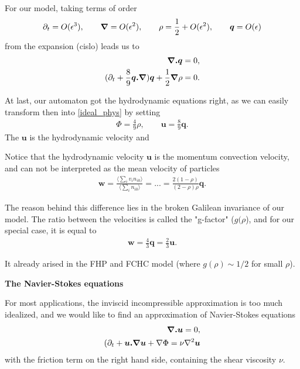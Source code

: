 For our model, taking terms of order
\begin{align}
\partial_t = O(\epsilon^3), \qquad \bm{\nabla} = O(\epsilon^2), \qquad \rho = \frac{1}{2} + O(\epsilon^2), \qquad \bm{q} = O(\epsilon)
\end{align}
from the expansion (cislo) leads us to
\begin{align}
\begin{split}
\bm{\nabla . q} &= 0, \\ 
(\partial_t + \frac{8}{9}\bm{q.\nabla})\bm{q} + \frac{1}{2} \bm{\nabla} \rho &= 0.
\end{split}
\end{align}

At last, our automaton got the hydrodynamic equations right, as we can easily transform then into \ref{ideal_phys} by setting
\begin{align} \label{transfor}
 \Phi = \frac{4}{9} \rho, \qquad \bm{u} = \frac{8}{9} \bm{q}.
\end{align}  
The $\bm{u}$ is the hydrodynamic velocity and 

Notice that the hydrodynamic velocity $\bm{u}$ is the momentum convection velocity, and can not be interpreted as the mean velocity of particles
\begin{align}
\bm{w} = \frac{\langle \sum_i v_i n_{i0} \rangle}{\langle \sum_i n_{i0} \rangle} = ... = \frac{2(1-\rho)}{(2 - \rho) \rho}\bm{q}.
\end{align}

The reason behind this difference lies in the broken Galilean invariance of our model.
The ratio between the velocities is called the "g-factor" ($g(\rho$), and for our special case, it is equal to
\begin{align}
\bm{w} = \frac{4}{3} \bm{q} = \frac{2}{3} \bm{u}.
\end{align}

It already arised in the FHP and FCHC model (where $g(\rho) \sim 1/2$ for small $\rho$).

\bigskip

\textbf{The Navier-Stokes equations}

For most applications, the inviscid incompressible approximation is too much idealized,
and we would like to find an approximation of Navier-Stokes equations
\begin{align} \label{nst}
\begin{split}
\bm{\nabla . u} = 0, \\
(\partial_t + \bm{u.\nabla}\bm{u} + \nabla \Phi = \nu \nabla^2 \bm{u}
\end{split}
\end{align}
with the friction term on the right hand side, containing the shear viscosity $\nu$.

